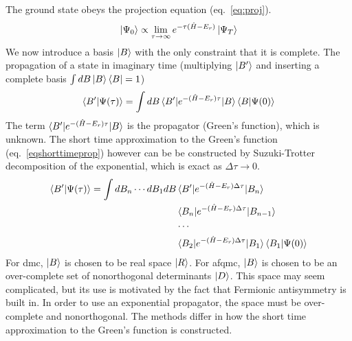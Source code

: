 The ground state obeys the projection equation (eq.~\ref{eq:proj}).
\begin{equation}
\ket{\Psi_0} \propto \lim_{\tau\rightarrow\infty} e^{-\tau (\hat{H} - E_r)} \ket{\Psi_T}
    \label{eq:proj}
\end{equation}
We now introduce a basis $\ket{B}$ with the only constraint that it is complete.
The propagation of a state in imaginary time (multiplying $\ket{B'}$ and inserting a complete basis $\int dB \ket{B}\bra{B} = 1$)
\begin{equation}
\braket{B'|\Psi(\tau)} = \int dB \braket{B'|e^{-(\hat{H}-E_r)\tau}|B}\braket{B|\Psi(0)}
    \label{eqprop}
\end{equation}
The term $\braket{B'|e^{-(\hat{H}-E_r)\tau}|B}$ is the propagator (Green's function), which is unknown. 
The short time approximation to the Green's function (eq.~\ref{eqshorttimeprop}) however can be be constructed by Suzuki-Trotter decomposition of the exponential, which is exact as $\Delta \tau \rightarrow 0$.\cite{10.1090/S0002-9939-1959-0108732-6,10.1007/BF01609348}
\begin{equation}
\begin{aligned}
    \braket{B'|\Psi(\tau)} = \int dB_{n} \cdots dB_{1} dB &\braket{B'|e^{-(\hat{H}-E_r)\Delta\tau}|B_{n}}\\
                                                          &\braket{B_{n}|e^{-(\hat{H}-E_r)\Delta\tau}|B_{n-1}}\\
                                                          &\cdots \\
                                                          &\braket{B_{2}|e^{-(\hat{H}-E_r)\Delta\tau}|B_{1}} \braket{B_{1}|\Psi(0)}
    \label{eqshorttimeprop}
\end{aligned}
\end{equation}
For \gls{dmc}, $\ket{B}$ is chosen to be real space $\ket{R}$.
For \gls{afqmc}, $\ket{B}$ is chosen to be an over-complete set of nonorthogonal determinants $\ket{D}$.
This space may seem complicated, but its use is motivated by the fact that Fermionic antisymmetry is built in.
In order to use an exponential propagator, the space must be over-complete and nonorthogonal.\cite{10.1103/PhysRevB.55.7464,10.1103/PhysRevLett.74.3652,10.1103/PhysRevLett.90.136401}
The methods differ in how the short time approximation to the Green's function is constructed.

